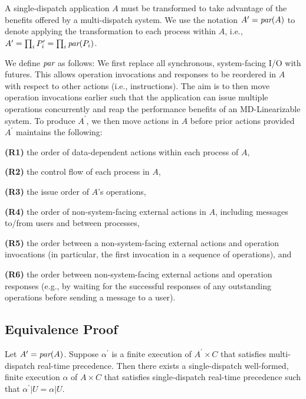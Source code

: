 A single-dispatch application $A$ must be transformed to take advantage of the benefits offered by a multi-dispatch system. We use the notation $A^\prime = \operatorname*{\textit{par}}(A)$ to denote applying the transformation to each process within $A$, i.e., $A^\prime = \prod_i P^\prime_i = \prod_i \operatorname*{\textit{par}}(P_i)$.

We define $\operatorname*{\textit{par}}$ as follows: We first replace all synchronous, system-facing I/O with futures. This allows operation invocations and responses to be reordered in $A$ with respect to other actions (i.e., instructions). The aim is to then move operation invocations earlier such that the application can issue multiple operations concurrently and reap the performance benefits of an MD-Linearizable system.
To produce $A^\prime$, we then move actions in $A$ before prior actions provided $A^\prime$ maintains the following:

    \textbf{(R1)} the order of data-dependent actions within each process of $A$,
    
    \textbf{(R2)} the control flow of each process in $A$,
    
    \textbf{(R3)} the issue order of $A$’s operations,
    
    \textbf{(R4)} the order of non-system-facing external actions in $A$, including messages to/from users and between processes,
    
    \textbf{(R5)} the order between a non-system-facing external actions and operation invocations (in particular, the first invocation in a sequence of operations), and
    
    \textbf{(R6)} the order between non-system-facing external actions and operation responses (e.g., by waiting for the successful responses of any outstanding operations before sending a message to a user).

\subsection{Equivalence Proof}
\label{sec:equivalence:proof}

\begin{thm}
 Let $A^\prime = \operatorname*{\textit{par}}(A)$. Suppose $\alpha^\prime$ is a finite execution of $A^\prime \times C$ that satisfies multi-dispatch real-time precedence. Then there exists a single-dispatch well-formed, finite execution $\alpha$ of $A \times C$ that satisfies single-dispatch real-time precedence such that $\alpha^\prime | U = \alpha | U$.
\end{thm}

